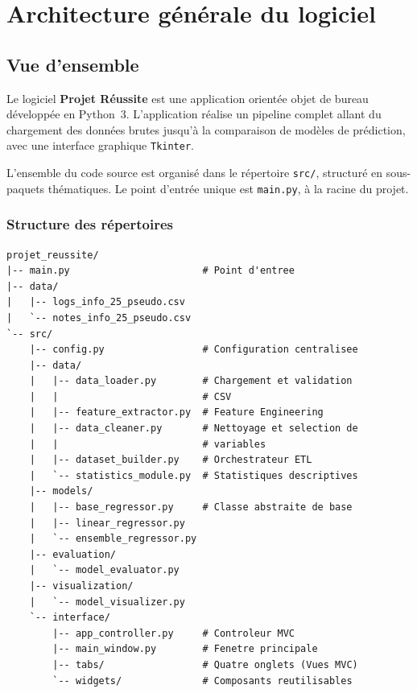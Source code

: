 \documentclass[12pt, a4paper, french]{report}
\begin{document}
\tableofcontents
\clearpage

\chapter{Architecture générale du logiciel}

\section{Vue d'ensemble}

Le logiciel \textbf{Projet Réussite} est une application orientée objet de bureau développée en Python~3.
L'application réalise un pipeline complet allant du chargement des données brutes jusqu'à la comparaison de modèles de prédiction, avec une interface graphique \texttt{Tkinter}.

L'ensemble du code source est organisé dans le répertoire \texttt{src/}, structuré en sous-paquets thématiques. Le point d'entrée unique est \texttt{main.py}, à la racine du projet.

\subsection{Structure des répertoires}

\begin{lstlisting}[style=bash, caption={Arborescence du projet}]
projet_reussite/
|-- main.py                       # Point d'entree
|-- data/
|   |-- logs_info_25_pseudo.csv
|   `-- notes_info_25_pseudo.csv
`-- src/
    |-- config.py                 # Configuration centralisee
    |-- data/
    |   |-- data_loader.py        # Chargement et validation
    |   |                         # CSV
    |   |-- feature_extractor.py  # Feature Engineering
    |   |-- data_cleaner.py       # Nettoyage et selection de
    |   |                         # variables
    |   |-- dataset_builder.py    # Orchestrateur ETL
    |   `-- statistics_module.py  # Statistiques descriptives
    |-- models/
    |   |-- base_regressor.py     # Classe abstraite de base
    |   |-- linear_regressor.py
    |   `-- ensemble_regressor.py
    |-- evaluation/
    |   `-- model_evaluator.py
    |-- visualization/
    |   `-- model_visualizer.py
    `-- interface/
        |-- app_controller.py     # Controleur MVC
        |-- main_window.py        # Fenetre principale
        |-- tabs/                 # Quatre onglets (Vues MVC)
        `-- widgets/              # Composants reutilisables
\end{lstlisting}
\end{document}
